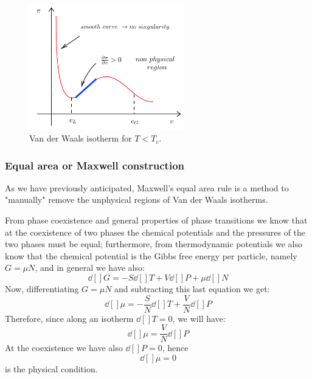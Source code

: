 \documentclass[../main/main.tex]{subfiles}
\begin{document}
\begin{figure}[h!]
\centering
\includegraphics[width=0.6\textwidth]{../lessons/14_image/4.pdf}
\caption{\label{fig:14_3} Van der Waals isotherm for \(T<T_c\).}
\end{figure}


\subsubsection{Equal area or Maxwell construction}
As we have previously anticipated, Maxwell's equal area rule is a method to "manually" remove the unphysical regions of Van der Waals isotherms.

From phase coexistence and general properties of phase transitions we know that at the coexistence of two phases the chemical potentials and the pressures of the two phases must be equal;  furthermore, from thermodynamic potentials we also know that the chemical potential is the Gibbs free energy per particle, namely \(G=\mu N \), and in general we have also:
\begin{equation*}
    \dd[]{G} = - S \dd[]{T} + V \dd[]{P} + \mu \dd[]{N}
\end{equation*}
Now, differentiating \(G=\mu N\) and subtracting this last equation we get:
\begin{equation}
  \dd[]{\mu } = - \frac{S}{N} \dd[]{T} + \frac{V}{N} \dd[]{P}
\end{equation}
Therefore, since along an isotherm  \( \dd[]{T}=0\), we will have:
\begin{equation}
  \dd[]{\mu } = \frac{V}{N} \dd[]{P}
\end{equation}
At the coexistence we have also \( \dd[]{P}= 0  \), hence
\begin{equation}
  \dd[]{\mu } = 0
\end{equation}
is the physical condition.
\end{document}

